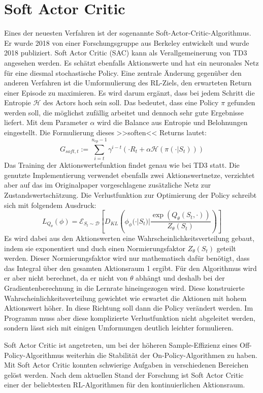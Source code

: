 \section{Soft Actor Critic}
Eines der neuesten Verfahren ist der sogenannte Soft-Actor-Critic-Algorithmus.
Er wurde 2018 von einer Forschungsgruppe aus Berkeley entwickelt und wurde 2018 publiziert. \cite{haarnoja2018soft}
Soft Actor Critic (SAC) kann als Verallgemeinerung von TD3 angesehen werden.
Es schätzt ebenfalls Aktionswerte und hat ein neuronales Netz für eine diesmal stochastische Policy.
Eine zentrale Änderung gegenüber den anderen Verfahren ist die Umformulierung des RL-Ziels, den erwarteten Return einer Episode zu maximieren.
Es wird darum ergänzt, dass bei jedem Schritt die Entropie $\mathcal{H}$ des Actors hoch sein soll.
Das bedeutet, dass eine Policy $\pi$ gefunden werden soll, die möglichst zufällig arbeitet und dennoch sehr gute Ergebnisse liefert.
Mit dem Parameter $\alpha$ wird die Balance aus Entropie und Belohnungen eingestellt.
Die Formulierung dieses >>soften<< Returns lautet:
\begin{equation}
	G_{soft,t} := \sum_{i=t}^{n_{ep} - 1} \gamma^{i - t} (\cdot R_t + \alpha \mathcal{H}(\pi(\cdot | S_t)))
\end{equation}
Das Training der Aktionswertefunktion findet genau wie bei TD3 statt.
Die genutzte Implementierung verwendet ebenfalls zwei Aktionswertnetze, verzichtet aber auf das im Originalpaper vorgeschlagene zusätzliche Netz zur Zustandswertschätzung. \cite{stable-baselines}
Die Verlustfunktion zur Optimierung der Policy schreibt sich mit folgendem Ausdruck:
\begin{equation}
	L_{Q_\theta}(\phi) = \mathcal{E}_{S_t \sim \mathcal{D}} \left[D_{KL}\left(\phi_\phi(\cdot | S_t) | \frac{\exp(Q_\theta(S_t, \cdot))}{Z_\theta(S_t)}\right)\right]
\end{equation}
Es wird dabei aus den Aktionswerten eine Wahrscheinlichkeitsverteilung gebaut, indem sie exponentiert und duch einen Normierungsfaktor $Z_\theta(S_t)$ geteilt werden.
Dieser Normierungsfaktor wird nur mathematisch dafür benötigt, dass das Integral über den gesamten Aktionsraum 1 ergibt.
Für den Algorithmus wird er aber nicht berechnet, da er nicht von $\theta$ abhängt und deshalb bei der Gradientenberechnung in die Lernrate hineingezogen wird.
Diese konstruierte Wahrscheinlichkeitsverteilung gewichtet wie erwartet die Aktionen mit hohem Aktionswert höher.
In diese Richtung soll dann die Policy verändert werden.
Im Programm muss aber diese komplizierte Verlustfunktion nicht abgeleitet werden, sondern lässt sich mit einigen Umformungen deutlich leichter formulieren.

Soft Actor Critic ist angetreten, um bei der höheren Sample-Effizienz eines Off-Policy-Algorithmus weiterhin die Stabilität der On-Policy-Algorithmen zu haben.
Mit Soft Actor Critic konnten schwierige Aufgaben in verschiedenen Bereichen gelöst werden.
Nach dem aktuellen Stand der Forschung ist Soft Actor Critic einer der beliebtesten RL-Algorithmen für den kontinuierlichen Aktionsraum.
